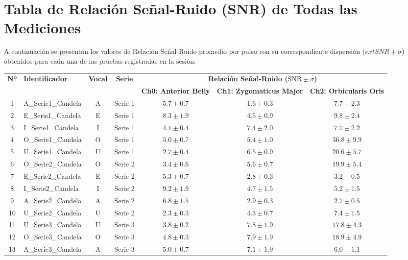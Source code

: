 \documentclass[11pt,a4paper]{article}
\begin{document}
\section{Tabla de Relación Señal-Ruido (SNR) de Todas las Mediciones}
A continuación se presentan los valores de Relación Señal-Ruido promedio por pulso con su correspondiente dispersión ($	ext{SNR} \pm \sigma$) obtenidos para cada una de las pruebas registradas en la sesión:
\begin{table}[H]
\centering
\small
\setlength{\tabcolsep}{4.5pt}
\begin{tabular}{c l c c c c c}
\toprule
\textbf{Nº} & \textbf{Identificador} & \textbf{Vocal} & \textbf{Serie} & \multicolumn{3}{c}{\textbf{Relación Señal-Ruido ($\text{SNR} \pm \sigma$)}} \\
\cmidrule(lr){5-7}
& & & & \textbf{Ch0: Anterior Belly} & \textbf{Ch1: Zygomaticus Major} & \textbf{Ch2: Orbicularis Oris} \\
\midrule
1 & A\_Serie1\_Candela & A & Serie 1 & $5.7 \pm 0.7$ & $1.6 \pm 0.3$ & $7.7 \pm 2.3$ \\
2 & E\_Serie1\_Candela & E & Serie 1 & $8.3 \pm 1.9$ & $4.5 \pm 0.9$ & $9.8 \pm 2.4$ \\
3 & I\_Serie1\_Candela & I & Serie 1 & $4.1 \pm 0.4$ & $7.4 \pm 2.0$ & $7.7 \pm 2.2$ \\
4 & O\_Serie1\_Candela & O & Serie 1 & $5.0 \pm 0.7$ & $5.4 \pm 1.0$ & $36.8 \pm 9.9$ \\
5 & U\_Serie1\_Candela & U & Serie 1 & $2.7 \pm 0.4$ & $6.5 \pm 0.9$ & $20.6 \pm 5.7$ \\
6 & O\_Serie2\_Candela & O & Serie 2 & $3.4 \pm 0.6$ & $5.6 \pm 0.7$ & $19.9 \pm 5.4$ \\
7 & E\_Serie2\_Candela & E & Serie 2 & $5.3 \pm 0.7$ & $2.8 \pm 0.3$ & $3.2 \pm 0.5$ \\
8 & I\_Serie2\_Candela & I & Serie 2 & $9.2 \pm 1.9$ & $4.7 \pm 1.5$ & $5.2 \pm 1.5$ \\
9 & A\_Serie2\_Candela & A & Serie 2 & $6.8 \pm 1.5$ & $2.9 \pm 0.3$ & $2.7 \pm 0.5$ \\
10 & U\_Serie2\_Candela & U & Serie 2 & $2.3 \pm 0.3$ & $4.3 \pm 0.7$ & $7.4 \pm 1.5$ \\
11 & U\_Serie3\_Candela & U & Serie 3 & $3.8 \pm 0.2$ & $7.8 \pm 1.9$ & $17.8 \pm 4.3$ \\
12 & O\_Serie3\_Candela & O & Serie 3 & $4.8 \pm 0.3$ & $7.9 \pm 1.9$ & $18.9 \pm 4.9$ \\
13 & A\_Serie3\_Candela & A & Serie 3 & $5.0 \pm 0.7$ & $7.1 \pm 1.9$ & $6.0 \pm 1.1$ \\

\end{tabular}
\end{table}
\end{document}
